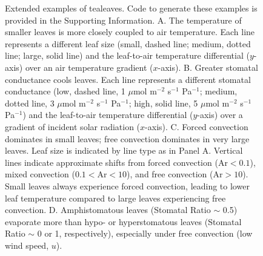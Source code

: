 \documentclass[11pt, oneside]{article}
\newcommand{\pkg}[1]{{\fontseries{b}\selectfont #1}}
\newcommand{\tealeaves}{\pkg{tealeaves}}
\begin{document}
\begin{figure}[t!]
\caption{Extended examples of \tealeaves. Code to generate these examples is provided in the Supporting Information. A. The temperature of smaller leaves is more closely coupled to air temperature. Each line represents a different leaf size (small, dashed line; medium, dotted line; large, solid line) and the leaf-to-air temperature differential ($y$-axis) over an air temperature gradient ($x$-axis). B. Greater stomatal conductance cools leaves. Each line represents a different stomatal conductance (low, dashed line, 1 $\mu$mol m$^{-2}$ s$^{-1}$ Pa$^{-1}$; medium, dotted line, 3 $\mu$mol m$^{-2}$ s$^{-1}$ Pa$^{-1}$; high, solid line, 5 $\mu$mol m$^{-2}$ s$^{-1}$ Pa$^{-1}$) and the leaf-to-air temperature differential ($y$-axis) over a gradient of incident solar radiation ($x$-axis). C. Forced convection dominates in small leaves; free convection dominates in very large leaves. Leaf size is indicated by line type as in Panel A. Vertical lines indicate approximate shifts from forced convection ($\mathrm{Ar} < 0.1$), mixed convection ($0.1 < \mathrm{Ar} < 10$), and free convection ($\mathrm{Ar} > 10$). Small leaves always experience forced convection, leading to lower leaf temperature compared to large leaves experiencing free convection. D. Amphistomatous leaves (Stomatal Ratio $\sim$ 0.5) evaporate more than hypo- or hyperstomatous leaves (Stomatal Ratio $\sim$ 0 or 1, respectively), especially under free convection (low wind speed, $u$).}
\label{fig:fig2}
\end{figure}

\clearpage

\end{document}
